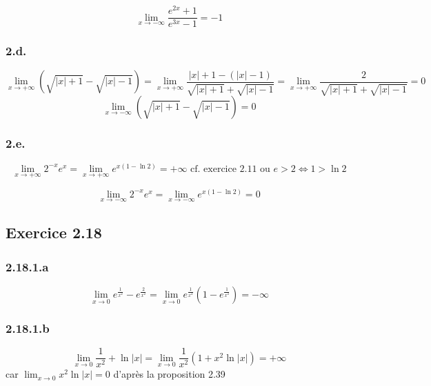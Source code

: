 \documentclass{report}
\begin{document}
\begin{displaymath}
	\lim_{x \rightarrow -\infty} \frac{e^{2x}+1}{e^{3x}-1} = -1
\end{displaymath}


\subsubsection*{2.d.}
\begin{displaymath}
	\lim_{x \rightarrow +\infty} \left( \sqrt{|x|+1} - \sqrt{|x|-1} \right)
		= \lim_{x \rightarrow +\infty} \frac{|x|+1-(|x|-1)}{\sqrt{|x|+1} + \sqrt{|x|-1}} = \lim_{x \rightarrow +\infty} \frac{2}{\sqrt{|x|+1} + \sqrt{|x|-1}} = 0
\end{displaymath}
\begin{displaymath}
	\lim_{x \rightarrow -\infty} \left( \sqrt{|x|+1} - \sqrt{|x|-1} \right) = 0
\end{displaymath}

\subsubsection*{2.e.}
\begin{displaymath}
	\lim_{x \rightarrow +\infty} 2^{-x}e^x = \lim_{x \rightarrow +\infty} e^{x(1-\ln 2)} = +\infty \text{ cf. exercice 2.11 ou } e>2 \Longleftrightarrow 1 > \ln 2
\end{displaymath}

\begin{displaymath}
	\lim_{x \rightarrow -\infty} 2^{-x}e^x = \lim_{x \rightarrow -\infty} e^{x(1-\ln 2)} = 0^{}
\end{displaymath}


\subsection*{Exercice 2.18}

\subsubsection*{2.18.1.a}
\begin{displaymath}
	\lim_{x \rightarrow 0} e^{\frac{1}{x^2}} - e^{\frac{2}{x^2}}  = \lim_{x \rightarrow 0} e^{\frac{1}{x^2}}(1 - e^{\frac{1}{x^2}}) = -\infty
\end{displaymath}

\subsubsection*{2.18.1.b}
\begin{displaymath}
	\lim_{x \rightarrow 0} \frac{1}{x^2}  + \ln |x| = \lim_{x \rightarrow 0} \frac{1}{x^2}  (1+ x^2\ln |x|) = +\infty
\end{displaymath}
car $ \lim_{x \rightarrow 0} x^2\ln |x| = 0$ d'après la proposition 2.39
\end{document}
